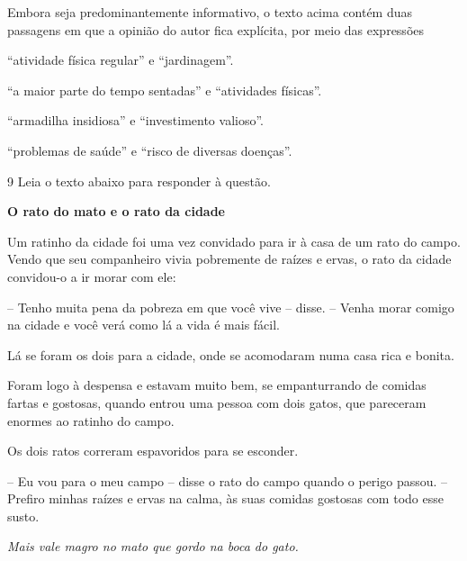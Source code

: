 Embora seja predominantemente informativo, o texto acima contém duas passagens
em que a opinião do autor fica explícita, por meio das expressões 

\begin{escolha}

    \item ``atividade física regular'' e ``jardinagem''. 

    \item ``a maior parte do tempo sentadas'' e ``atividades físicas''.  

    \item ``armadilha insidiosa'' e ``investimento valioso''.  

    \item ``problemas de saúde'' e ``risco de diversas doenças''. 

\end{escolha}

\num{9} Leia o texto abaixo para responder à questão. 

\begin{myquote}

\textbf{O rato do mato e o rato da cidade}

Um ratinho da cidade foi uma vez convidado para ir à casa
de um rato do campo. Vendo que seu companheiro vivia pobremente de
raízes e ervas, o rato da cidade convidou-o a ir morar com ele:

-- Tenho muita pena da pobreza em que você vive --
disse. -- Venha morar comigo na cidade e você verá como lá a
vida é mais fácil.

Lá se foram os dois para a cidade, onde se acomodaram
numa casa rica e bonita.

Foram logo à despensa e estavam muito bem, se
empanturrando de comidas fartas e gostosas, quando entrou uma
pessoa com dois gatos, que pareceram enormes ao ratinho do
campo.

Os dois ratos correram espavoridos para se esconder.

-- Eu vou para o meu campo -- disse o rato do campo
quando o perigo passou. -- Prefiro minhas raízes e ervas na
calma, às suas comidas gostosas com todo esse susto.

\textit{Mais vale magro no mato que gordo na boca do gato.} 


\end{myquote}

